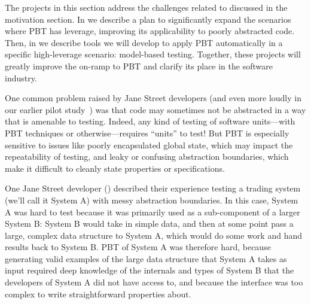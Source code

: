 The projects in this section address the challenges related to 
discussed in the motivation section. In  we describe
a plan to significantly expand the scenarios where PBT has leverage, improving
its applicability to poorly abstracted code. Then, in
 we describe tools we will develop to apply PBT 
automatically in a specific high-leverage
scenario: model-based testing.  Together, these projects will greatly
improve the on-ramp to PBT and clarify its place in the software industry.

%
%
%
One common problem raised by Jane Street developers (and even more loudly
in our earlier pilot study~\cite{ref:goldstein2022some}) was
that code may sometimes not be abstracted
in a way that is amenable to testing. Indeed, any kind of
testing of software units---with PBT techniques or otherwise---requires
``units'' to test!  But PBT is
especially sensitive to issues like poorly encapsulated global state, which may
impact the repeatability of testing, and leaky or confusing
abstraction boundaries, which make it difficult to cleanly state
properties or specifications.

One Jane Street developer () described their experience testing
a trading system (we'll call it System A) with messy abstraction boundaries. In
this case, System A was hard to test because it was primarily used as a
sub-component of a larger System B: System B would take in simple data, and then
at some point pass a large, complex data structure to System A, which would do
some work and hand results back to System B. PBT of System A was therefore hard,
because generating valid examples of the large data structure that System A
takes as input required deep knowledge of the internals and types of System B
that the developers of System A did not have access to, and because the
interface was too complex to write straightforward properties about. 

